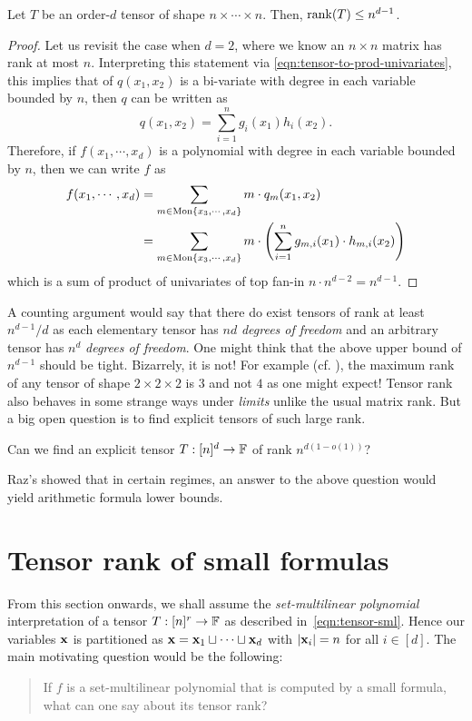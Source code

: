 \begin{lemma}\label{lem:tensor-rank-trivial-upperbound}
  Let $T$ be an order-$d$ tensor of shape $n\times \cdots \times n$.
Then, $\operatorname{rank}(T) \leq n^{d-1}$.
\end{lemma}
\begin{proof}
  Let us revisit the case when $d=2$, where we know an $n\times n$ matrix has rank at most $n$.
Interpreting this statement via \eqref{eqn:tensor-to-prod-univariates}, this implies that of $q(x_1,x_2)$ is a bi-variate with degree in each variable bounded by $n$, then $q$ can be written as
\[
q(x_1,x_2) = \sum_{i=1}^n g_i(x_1) h_i(x_2).
\]
Therefore, if $f(x_1,\cdots, x_d)$ is a polynomial with degree in each variable bounded by $n$, then we can write $f$ as
\begin{align*}
f(x_1,\cdots, x_d) &= \sum_{m \in \mathrm{Mon}\left\{x_3,\cdots, x_d\right\}} m \cdot q_m(x_1,x_2)\\
& = \sum_{m \in \mathrm{Mon}\left\{x_3,\cdots, x_d\right\}} m \cdot \left(\sum_{i=1}^n g_{m,i}(x_1) \cdot h_{m,i}(x_2)\right)
\end{align*}
which is a sum of product of univariates of top fan-in $n \cdot n^{d-2} = n^{d-1}$. 
\end{proof}

A counting argument would say that there do exist tensors of rank at least $n^{d-1}/d$ as each elementary tensor has $nd$ \emph{degrees of freedom} and an arbitrary tensor has $n^d$ \emph{degrees of freedom}.
One might think that the above upper bound of $n^{d-1}$ should be tight.
Bizarrely, it is not!
For example (cf.
\cite{p85}), the maximum rank of any tensor of shape $2\times 2 \times 2$ is $3$ and not $4$ as one might expect!
Tensor rank also behaves in some strange ways under \emph{limits} unlike the usual matrix rank.
But a big open question is to find explicit tensors of such large rank.

\begin{openproblem}
Can we find an explicit tensor $T: [n]^d \rightarrow \mathbb{F}$ of rank $n^{d(1 - o(1))}$?
\end{openproblem}

Raz's \cite{raz10} showed that in certain regimes, an answer to the above question would yield arithmetic formula lower bounds. 

\section{Tensor rank of small formulas}

From this section onwards, we shall assume the \emph{set-multilinear polynomial} interpretation of a tensor $T:[n]^r \rightarrow \mathbb{F}$ as described in~\eqref{eqn:tensor-sml}.
Hence our variables $\mathbf{x}$ is partitioned as $\mathbf{x} = \mathbf{x}_1 \sqcup \cdots \sqcup \mathbf{x}_d$ with $\left|\mathbf{x}_i\right| = n$ for all $i\in [d]$.
The main motivating question would be the following:
\begin{quote}
If $f$ is a set-multilinear polynomial that is computed by a small formula, what can one say about its tensor rank?
\end{quote}

